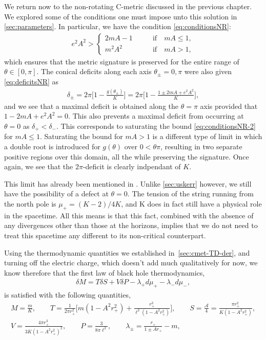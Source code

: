 \documentclass[
twoside,
openright,
frontopenright
]{dmathesis}
\newcommand{\nn}{\nonumber}
\begin{document}
We return now to the non-rotating C-metric discussed in the previous chapter. We
explored some of the conditions one must impose unto this solution in
\cref{sec:parameters}. In particular, we have the condition
\eqref{eq:conditionsNR}:
\begin{align}
  \label{eq:conditionsNR-2}
  e^2A^2 >
  \begin{cases}
    2mA - 1 \qquad &\mbox{if} \quad mA \leqslant 1,\\
    m^2A^2 \qquad &\mbox{if} \quad mA > 1,
  \end{cases}
\end{align}
which ensures that the metric signature is preserved for the entire range of
$\theta\in [0,\pi]$. The conical deficits along each axis $\theta_\pm = 0,\pi$
were also given \eqref{eq:deficitsNR} as
\begin{align}
  \label{eq:deficitsNR-2}
  \delta_\pm=2\pi\bigg[1-\frac{g(\theta_\pm)}{K}\bigg] = 2\pi\bigg[1-\frac{1\pm
  2mA + e^2A^2}{K}\bigg],
\end{align}
and we see that a maximal deficit is obtained along the $\theta = \pi$ axis
provided that $1-2mA + e^2 A^2 = 0$. This also prevents a maximal deficit from
occurring at $\theta = 0$ as $\delta_+<\delta_-$. This corresponds to saturating
the bound \eqref{eq:conditionsNR-2} for $mA \leqslant 1$. Saturating the bound
for $mA > 1$ is a different type of limit in which a double root is introduced
for $g(\theta)$ over $0<\theta\pi$, resulting in two separate positive regions
over this domain, all the while preserving the signature. Once again, we see
that the $2\pi$-deficit is clearly indpendant of $K$.

This limit has already been mentioned in
\cite{Chen:2015vma,Hubeny:2009ru}. Unlike \cref{sec:uskerr} however, we still
have the possibility of a defect at $\theta = 0$. The tension of the string
running from the north pole is $\mu_+ = (K-2)/4K$, and K does in fact still have
a physical role in the spacetime. All this means is that this fact, combined
with the absence of any divergences other than those at the horizons, implies
that we do not need to treat this spacetime any different to its non-critical
counterpart.

Using the thermodynamic quantities we established in~\cref{sec:cmet-TD-der}, and
turning off the electric charge, which doesn't add much qualitatively for now,
we know therefore that the first law of black hole thermodynamics,
\begin{align}\label{eq:firstlawnr}
\delta M = T\delta S + V\delta P - \lambda_+ d\mu_+ - \lambda_- d\mu_-,
\end{align}
is satisfied with the following quantities,
\begin{gather}
M=\frac{m}{K},\qquad T=\frac{1}{2\pi
  r_+^2}\bigg[m(1-A^2 r_+^2) + \frac{r_+^3}{\ell^2(1-A^2 r_+^2)}\bigg], \qquad
S=\frac{\mathcal{A}}{4} = \frac{\pi r_+^2}{K(1- A^2 r_+^2)},\nn\\ 
V=\frac{4 \pi  r_+^3}{3 K (1- A^2 r_+^2)^2}, \qquad P=\frac{3}{8\pi \ell^2},
\qquad \lambda_\pm = \frac{r_+}{1\pm A r_+} - m,
\end{gather}
\end{document}
